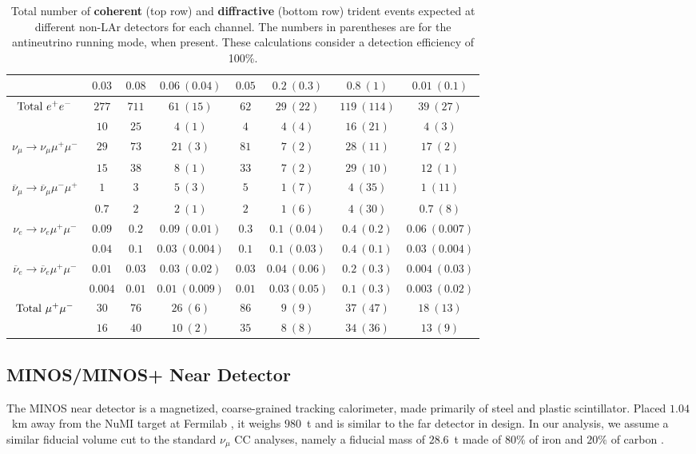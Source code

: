 \begin{table}[t]
\begin{center}
{\begin{tabular}{|cccccccc|}
    &$0.03$ &$0.08$ &$0.06~(0.04)$ &$0.05$&$0.2~(0.3)$ &$0.8~(1)$& $0.01~(0.1)$\\\hline
    \hline\hline
    ${\rm{Total}}\  e^+ e^-$& $277$ &$711$ &$61~(15)$ &$62$&$29~(22)$ &$119~(114)$& $39~(27)$\\
    &$10$ &$25$ &$4~(1)$ &$4$&$4~(4)$ &$16~(21)$& $4~(3)$\\\hline
    \hline    
    		$\nu_\mu\to\nu_\mu \mu^+ \mu^-$& $29$ &$73$ &$21~(3)$ &$81$&$7~(2)$ &$28~(11)$& $17~(2)$ \\
        &$15$ &$38$ &$8~(1)$ &$33$&$7~(2)$ &$29~(10)$& $12~(1)$\\\hline
        $\overline\nu_\mu\to\overline\nu_\mu \mu^- \mu^+$& $1$ &$3$ &$5~(3)$&$5$ &$1~(7)$ &$4~(35)$& $1~(11)$\\
        &$0.7$ &$2$ &$2~(1)$ &$2$&$1~(6)$ &$4~(30)$& $0.7~(8)$\\\hline
 $\nu_e\to\nu_e \mu^+ \mu^-$    &$0.09$ &$0.2$ &$0.09~(0.01)$&$0.3$ &$0.1~(0.04)$ &$0.4~(0.2)$& $0.06~(0.007)$\\  
 &$0.04$ &$0.1$ &$0.03~(0.004)$ &$0.1$&$0.1~(0.03)$ &$0.4~(0.1)$& $0.03~(0.004)$\\\hline
        $\overline\nu_e\to\overline\nu_e \mu^+ \mu^-$&$0.01$ &$0.03$ &$0.03~(0.02)$ &$0.03$&$0.04~(0.06)$&$0.2~(0.3)$ & $0.004~(0.03)$\\
        &$0.004$ &$0.01$ &$0.01~(0.009)$ &$0.01$&$~0.03(0.05)$  &$0.1~(0.3)$ & $0.003~(0.02)$\\\hline
        \hline \hline
    ${\rm{Total}} \ \mu^+ \mu^-$ &$30$ &$76$ &$26~(6)$&$86$ &$9~(9)$ &$37~(47)$ & $18~(13)$ \\
    &$16$ &$40$ &$10~(2)$ &$35$&$8~(8)$ &$34~(36)$ & $13~(9)$\\
    \hline\hline
\end{tabular}}
\end{center}
\caption{\label{tab:otherrates}Total number of \textbf{coherent} (top row) and \textbf{diffractive} (bottom row) trident events expected at different non-LAr detectors for each channel. The numbers in parentheses are for the antineutrino running mode, when present. These calculations consider a detection efficiency of 100\%.}
\end{table}

\subsection{MINOS/MINOS+ Near Detector}
\label{subsec:MINOS}
The MINOS near detector is a magnetized, coarse-grained tracking calorimeter, made primarily of steel and plastic scintillator. Placed $1.04$~km away from the NuMI target at Fermilab \cite{Aliaga:2016oaz}, it weighs $980$~t and is similar to the far detector in design. In our analysis, we assume a similar fiducial volume cut to the standard $\nu_\mu$ CC analyses, namely a fiducial mass of $28.6$~t made
of $80\%$ of iron and $20\%$ of carbon \cite{Boehm:2009zz}.

